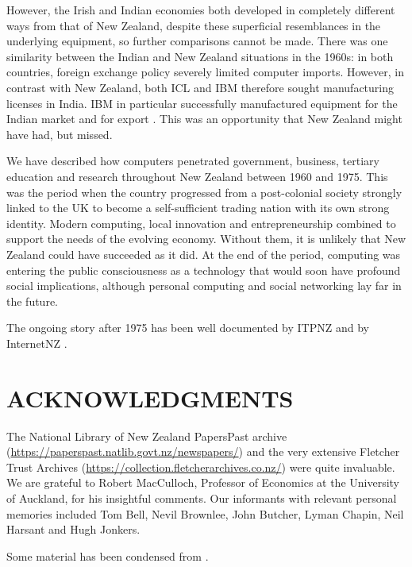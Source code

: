 \documentclass{IEEEcsmag}
\begin{document}
However, the Irish and Indian economies
both developed in completely different ways from that of New Zealand, despite
these superficial resemblances in the underlying equipment, so further comparisons
cannot be made. There was one similarity between the Indian and New Zealand
situations in the 1960s: in both countries, foreign exchange policy
severely limited computer imports. However, in contrast with New Zealand, both ICL 
and IBM therefore sought manufacturing licenses in India. IBM in particular successfully
manufactured equipment for the Indian market and for export \cite{Rajaraman-2015}. 
This was an opportunity that New Zealand might have had, but missed.

We have described how computers penetrated government, business, tertiary education 
and research throughout New Zealand between 1960 and 1975. This was the period
when the country progressed from a post-colonial society strongly linked to the UK to
become a self-sufficient trading nation with its own strong identity. Modern computing,
local innovation and entrepreneurship combined to support the needs of the
evolving economy. Without them, it is unlikely that New Zealand could have
succeeded as it did. At the end of the period, computing was entering the public
consciousness as a technology that would soon have profound social implications,
although personal computing and social networking lay far in the future.

The ongoing story after 1975 has been well documented by ITPNZ \cite{ITPNZ}
and by InternetNZ \cite{ConnectingClouds}.

\vspace*{-8pt}
\section{ACKNOWLEDGMENTS}
The National Library of New Zealand PapersPast archive
(\href{https://paperspast.natlib.govt.nz/newspapers}{https://paperspast.natlib.govt.nz/newspapers/})
and the very extensive Fletcher Trust Archives
(\href{https://collection.fletcherarchives.co.nz/}{https://collection.fletcherarchives.co.nz/}) were quite invaluable.
We are grateful to Robert MacCulloch, Professor of Economics at the University of Auckland, for his
insightful comments. Our informants with relevant personal memories included Tom Bell, Nevil Brownlee,
John Butcher, Lyman Chapin, Neil Harsant and Hugh Jonkers.

Some material has been condensed from \cite{Toland-Databank}. 
\end{document}
